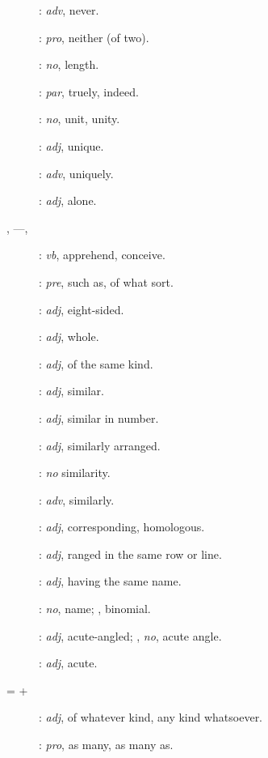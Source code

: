{\begin{description}
\item[]: {\em adv}, never.
\item[]: {\em pro}, neither (of two).
\item[]: {\em no}, length.
\item[]: {\em par}, truely, indeed.
\item[]: {\em no}, unit, unity.
\item[]: {\em adj}, unique.
\item[]: {\em adv}, uniquely.
\item[]: {\em adj}, alone.
\item[, ---, ]: {\em vb}, apprehend, conceive.
\item[]: {\em pre}, such as, of what sort.
\item[]: {\em adj}, eight-sided.
\item[]: {\em adj}, whole.
\item[]: {\em adj}, of the same kind.
\item[]: {\em adj}, similar.
\item[]: {\em adj}, similar in number.
\item[]: {\em adj}, similarly arranged.
\item[]: {\em no} similarity.
\item[]: {\em adv}, similarly.
\item[]: {\em adj}, corresponding, homologous.
\item[]: {\em adj}, ranged in the same row or line.
\item[]: {\em adj}, having the same name.
\item[]: {\em no}, name; ,
binomial.
\item[]: {\em adj}, acute-angled; ,
{\em no}, acute angle.
\item[]: {\em adj}, acute.
\item [ =  + ]: {\em adj}, of whatever kind, any kind whatsoever.
\item[]: {\em pro}, as many, as many as.

\end{description}}

